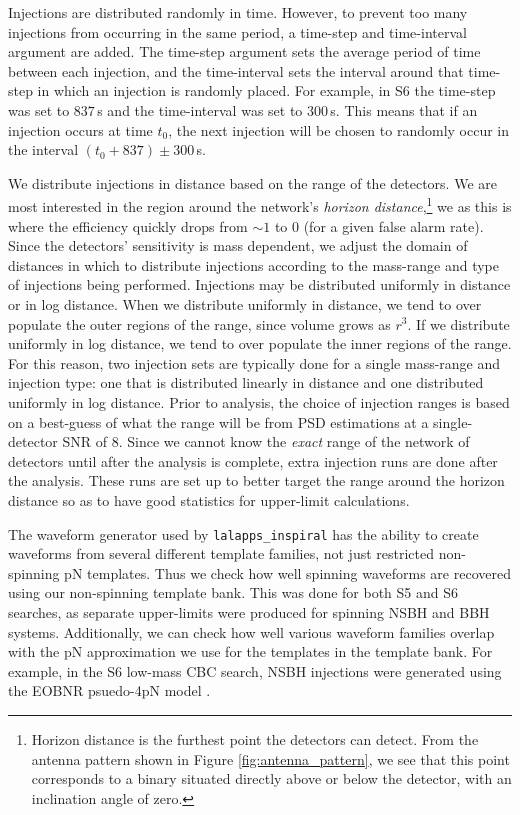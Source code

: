 Injections are distributed randomly in time. However, to prevent too many
injections from occurring in the same period, a time-step and time-interval
argument are added. The time-step argument sets the average period of time
between each injection, and the time-interval sets the interval around that
time-step in which an injection is randomly placed. For example, in \ac{S6} the
time-step was set to $837\,$s and the time-interval was set to $300\,$s. This
means that if an injection occurs at time $t_0$, the next injection will be
chosen to randomly occur in the interval $(t_0 + 837) \pm 300\,$s.

We distribute injections in distance based on the range of the detectors. We
are most interested in the region around the network's \emph{horizon
distance},\footnote{Horizon distance is the furthest point the detectors can
detect. From the antenna pattern shown in Figure \ref{fig:antenna_pattern}, we
see that this point corresponds to a binary situated directly above or below the
detector, with an inclination angle of zero.} we as this is where the
efficiency quickly drops from $\sim1$ to $0$ (for a given false alarm rate).
Since the detectors' sensitivity is mass dependent, we adjust the domain of
distances in which to distribute injections according to the mass-range and
type of injections being performed. Injections may be distributed uniformly in
distance or in log distance. When we distribute uniformly in distance, we tend
to over populate the outer regions of the range, since volume grows as $r^3$.
If we distribute uniformly in log distance, we tend to over populate the inner
regions of the range. For this reason, two injection sets are typically done
for a single mass-range and injection type: one that is distributed linearly in
distance and one distributed uniformly in log distance. Prior to analysis, the
choice of injection ranges is based on a best-guess of what the range will be
from \ac{PSD} estimations at a single-detector \ac{SNR} of 8. Since we cannot
know the \emph{exact} range of the network of detectors until after the
analysis is complete, extra injection runs are done after the analysis. These
runs are set up to better target the range around the horizon distance so as to
have good statistics for upper-limit calculations.

The waveform generator used by \texttt{lalapps\_inspiral} has the ability to
create waveforms from several different template families, not just restricted
non-spinning \ac{pN} templates. Thus we check how well spinning waveforms are
recovered using our non-spinning template bank. This was done for both \ac{S5}
and \ac{S6} searches, as separate upper-limits were produced for spinning
\ac{NSBH} and \ac{BBH} systems. Additionally, we can check how well various
waveform families overlap with the \ac{pN} approximation we use for the
templates in the template bank. For example, in the \ac{S6} low-mass \ac{CBC}
search, \ac{NSBH} injections were generated using the EOBNR psuedo-4\ac{pN}
model \cite{Buonanno:2009qa}.


